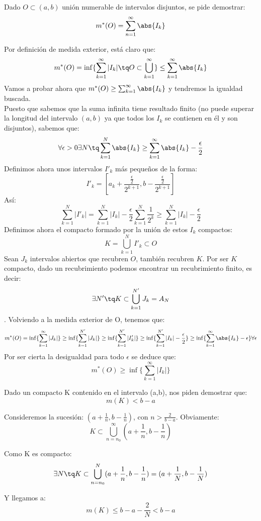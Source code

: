 \begin{problem}[9]
Dado $O\subset (a,b)$ unión numerable de intervalos disjuntos, se pide demostrar:
\[m^*(O)=\sum_{n=1}^{\infty} \abs{I_k}\]

\solution
Por definición de medida exterior, está claro que:
\[m^*(O)=\inf\{\sum_{k=1}^{\infty}|I_k| \tq O \subset \bigcup_{k=1}^{\infty}\} \leq \sum_{k=1}^{\infty} \abs{I_k}\]
Vamos a probar ahora que $m^*(O) \geq \sum_{k=1}^{\infty} \abs{I_k}$ y tendremos la igualdad buscada.\\
Puesto que sabemos que la suma infinita tiene resultado finito (no puede superar la longitud del intervalo $(a,b)$ ya que todos los $I_k$ se contienen en él y son disjuntos), sabemos que:
\[\forall \epsilon > 0 \exists N \tq \sum_{k=1}^{N} \abs{I_k} \geq \sum_{k=1}^{\infty} \abs{I_k} - \frac{\epsilon}{2}\]
Definimos ahora unos intervalos $I'_k$ más pequeños de la forma:
\[I'_k=[a_k+\frac{\frac{\epsilon}{2}}{2^{k+1}}, b-\frac{\frac{\epsilon}{2}}{2^{k+1}}]\]
Así:
\[\sum_{k=1}^{N}|I'_k| = \sum_{k=1}^{N}|I_k|-\frac{\epsilon}{2}\sum_{k=1}^{N}\frac{1}{2^k} \geq \sum_{k=1}^{N}|I_k|-\frac{\epsilon}{2}\]
Definimos ahora el compacto formado por la unión de estos $I_k$ compactos:
\[K =\bigcup_{k=1}^{N}I'_k \subset O\]
Sean $J_k$ intervalos abiertos que recubren $O$, también recubren $K$. Por ser $K$ compacto, dado un recubrimiento podemos encontrar un recubrimiento finito, es decir:
\[\exists N' \tq K \subset \bigcup_{k=1}^{N'}J_k = A_N\].
Volviendo a la medida exterior de O, tenemos que:
\[m^*(O) = \inf \{\sum_{k=1}^{\infty}|J_k|\} \geq \inf\{\sum_{k=1}^{N'}|J_k|\} \geq \inf\{\sum_{k=1}^{N'}|I'_k|\} \geq \inf\{\sum_{k=1}^{N'}|I_k|-\frac{\epsilon}{2}\} \geq \inf \{\sum_{k=1}^{\infty} \abs{I_k} -\epsilon\} \forall \epsilon\]
Por ser cierta la desigualdad para todo $\epsilon$ se deduce que:
\[m^*(O) \geq \inf \{\sum_{k=1}^{\infty}|I_k|\}\]
\end{problem}

\begin{problem}[10]
Dado un compacto K contenido en el intervalo (a,b), nos piden demostrar que:
\[m(K)<b-a\]

\solution
Consideremos la sucesión: $(a+\frac{1}{n}, b - \frac{1}{n})$, con $n >\frac{2}{b-a}$. Obviamente:
\[K \subset \bigcup_{n=n_0}^{\infty}(a+\frac{1}{n}, b - \frac{1}{n})\]

Como K es compacto:
\[\exists N \tq K \subset \bigcup_{n=n_0}^{N}(a+\frac{1}{n}, b - \frac{1}{n}) = (a+\frac{1}{N}, b - \frac{1}{N}) \]

Y llegamos a:
\[m(K) \leq b-a-\frac{2}{N} < b-a\]

\end{problem}

